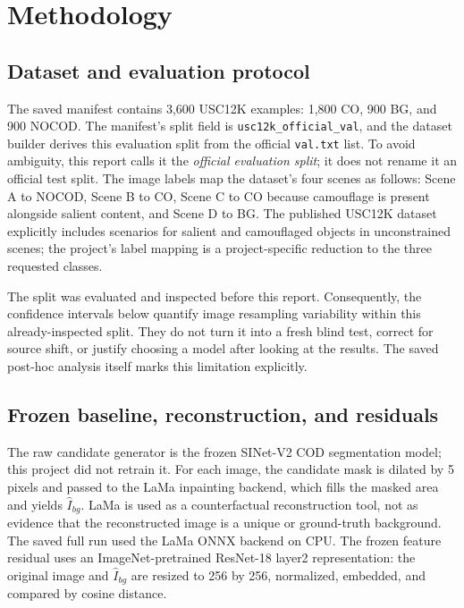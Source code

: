 \documentclass[10pt,a4paper]{article}
\begin{document}
\section{Methodology}
\subsection{Dataset and evaluation protocol}
The saved manifest contains 3,600 USC12K examples: 1,800 CO, 900 BG, and 900 NOCOD. The manifest's split field is \texttt{usc12k\_official\_val}, and the dataset builder derives this evaluation split from the official \texttt{val.txt} list. To avoid ambiguity, this report calls it the \emph{official evaluation split}; it does not rename it an official test split. The image labels map the dataset's four scenes as follows: Scene A to NOCOD, Scene B to CO, Scene C to CO because camouflage is present alongside salient content, and Scene D to BG. The published USC12K dataset explicitly includes scenarios for salient and camouflaged objects in unconstrained scenes; the project's label mapping is a project-specific reduction to the three requested classes. \citep{usc12k}


The split was evaluated and inspected before this report. Consequently, the confidence intervals below quantify image resampling variability within this already-inspected split. They do not turn it into a fresh blind test, correct for source shift, or justify choosing a model after looking at the results. The saved post-hoc analysis itself marks this limitation explicitly.


\subsection{Frozen baseline, reconstruction, and residuals}
The raw candidate generator is the frozen SINet-V2 COD segmentation model; this project did not retrain it. For each image, the candidate mask is dilated by 5 pixels and passed to the LaMa inpainting backend, which fills the masked area and yields \(\hat I_{bg}\). LaMa is used as a counterfactual reconstruction tool, not as evidence that the reconstructed image is a unique or ground-truth background. The saved full run used the LaMa ONNX backend on CPU. The frozen feature residual uses an ImageNet-pretrained ResNet-18 layer2 representation: the original image and \(\hat I_{bg}\) are resized to 256 by 256, normalized, embedded, and compared by cosine distance. \citep{sinetv2,lama}
\end{document}
